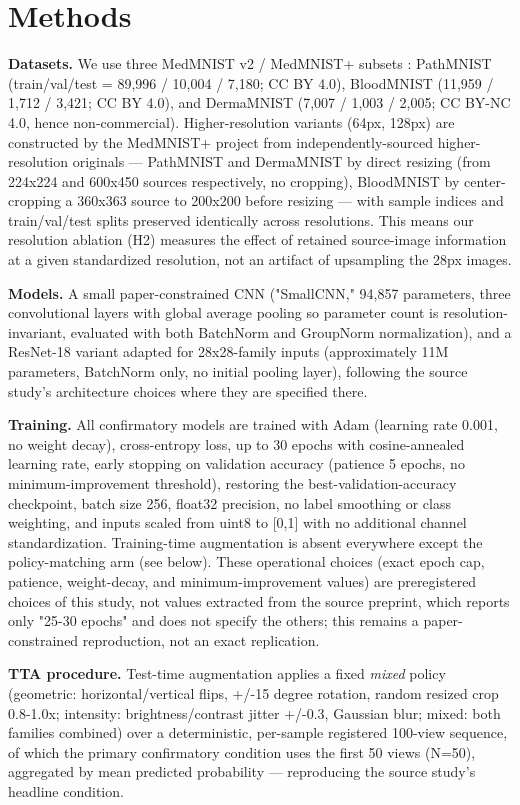 \section{Methods}

\textbf{Datasets.} We use three MedMNIST v2 / MedMNIST+ subsets \citep{yang2023medmnistv2,yang2021medmnist}: PathMNIST (train/val/test = 89,996 / 10,004 / 7,180; CC BY 4.0), BloodMNIST (11,959 / 1,712 / 3,421; CC BY 4.0), and DermaMNIST (7,007 / 1,003 / 2,005; CC BY-NC 4.0, hence non-commercial). Higher-resolution variants (64px, 128px) are constructed by the MedMNIST+ project from independently-sourced higher-resolution originals --- PathMNIST and DermaMNIST by direct resizing (from 224x224 and 600x450 sources respectively, no cropping), BloodMNIST by center-cropping a 360x363 source to 200x200 before resizing --- with sample indices and train/val/test splits preserved identically across resolutions. This means our resolution ablation (H2) measures the effect of retained source-image information at a given standardized resolution, not an artifact of upsampling the 28px images.

\textbf{Models.} A small paper-constrained CNN ("SmallCNN," 94,857 parameters, three convolutional layers with global average pooling so parameter count is resolution-invariant, evaluated with both BatchNorm and GroupNorm normalization), and a ResNet-18 variant adapted for 28x28-family inputs (approximately 11M parameters, BatchNorm only, no initial pooling layer), following the source study's architecture choices where they are specified there.

\textbf{Training.} All confirmatory models are trained with Adam (learning rate 0.001, no weight decay), cross-entropy loss, up to 30 epochs with cosine-annealed learning rate, early stopping on validation accuracy (patience 5 epochs, no minimum-improvement threshold), restoring the best-validation-accuracy checkpoint, batch size 256, float32 precision, no label smoothing or class weighting, and inputs scaled from uint8 to [0,1] with no additional channel standardization. Training-time augmentation is absent everywhere except the policy-matching arm (see below). These operational choices (exact epoch cap, patience, weight-decay, and minimum-improvement values) are preregistered choices of this study, not values extracted from the source preprint, which reports only "25-30 epochs" and does not specify the others; this remains a paper-constrained reproduction, not an exact replication.

\textbf{TTA procedure.} Test-time augmentation applies a fixed \emph{mixed} policy (geometric: horizontal/vertical flips, +/-15 degree rotation, random resized crop 0.8-1.0x; intensity: brightness/contrast jitter +/-0.3, Gaussian blur; mixed: both families combined) over a deterministic, per-sample registered 100-view sequence, of which the primary confirmatory condition uses the first 50 views (N=50), aggregated by mean predicted probability --- reproducing the source study's headline condition.

